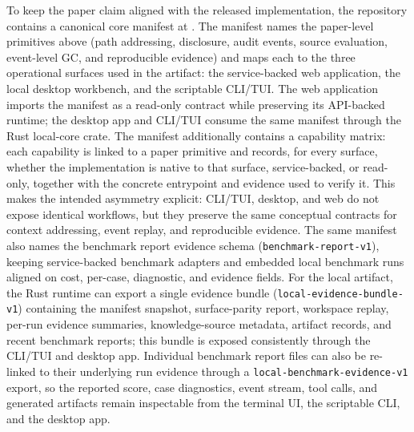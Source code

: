 To keep the paper claim aligned with the released implementation, the
repository contains a canonical core manifest at
. The manifest names the paper-level
primitives above (path addressing, disclosure, audit events, source
evaluation, event-level GC, and reproducible evidence) and maps each to
the three operational surfaces used in the artifact: the service-backed
web application, the local desktop workbench, and the scriptable
CLI/TUI. The web application imports the manifest as a read-only
contract while preserving its API-backed runtime; the desktop app and
CLI/TUI consume the same manifest through the Rust local-core crate.
The manifest additionally contains a capability matrix: each capability
is linked to a paper primitive and records, for every surface, whether
the implementation is native to that surface, service-backed, or
read-only, together with the concrete entrypoint and evidence used to
verify it. This makes the intended asymmetry explicit: CLI/TUI,
desktop, and web do not expose identical workflows, but they preserve
the same conceptual contracts for context addressing, event replay, and
reproducible evidence. The same manifest also names the benchmark
report evidence schema (\texttt{benchmark-report-v1}), keeping
service-backed benchmark adapters and embedded local benchmark runs
aligned on cost, per-case, diagnostic, and evidence fields. For the
local artifact, the Rust runtime can export a single evidence bundle
(\texttt{local-evidence-bundle-v1}) containing the manifest snapshot,
surface-parity report, workspace replay, per-run evidence summaries,
knowledge-source metadata, artifact records, and recent benchmark
reports; this bundle is exposed consistently through the CLI/TUI and
desktop app. Individual benchmark report files can also be re-linked
to their underlying run evidence through a
\texttt{local-benchmark-evidence-v1} export, so the reported score,
case diagnostics, event stream, tool calls, and generated artifacts
remain inspectable from the terminal UI, the scriptable CLI, and the
desktop app.

